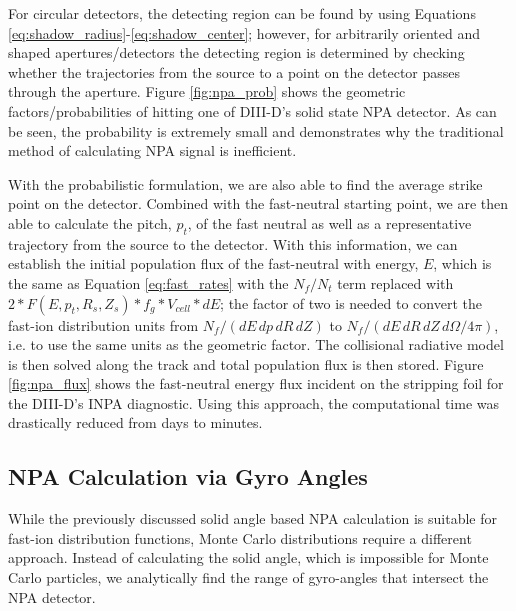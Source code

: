 For circular detectors, the detecting region can be found by using Equations \ref{eq:shadow_radius}-\ref{eq:shadow_center}; however, for arbitrarily oriented and shaped apertures/detectors the detecting region is determined by checking whether the trajectories from the source to a point on the detector passes through the aperture.
Figure \ref{fig:npa_prob} shows the geometric factors/probabilities of hitting one of DIII-D's solid state NPA detector. As can be seen, the probability is extremely small and demonstrates why the traditional method of calculating NPA signal is inefficient. 

With the probabilistic formulation, we are also able to find the average strike point on the detector. Combined with the fast-neutral starting point, we are then able to calculate the pitch, $p_t$, of the fast neutral as well as a representative trajectory from the source to the detector. With this information, we can establish the initial population flux of the fast-neutral with energy, $E$, which is the same as Equation \ref{eq:fast_rates} with the $N_f/N_t$ term replaced with $2*F(E,p_t,R_s,Z_s)*f_g*V_{cell}*dE$; the factor of two is needed to convert the fast-ion distribution units from $N_f/(dE\,dp\,dR\,dZ)$ to $N_f/(dE\,dR\,dZ\,d\Omega/4\pi)$, i.e. to use the same units as the geometric factor. The collisional radiative model is then solved along the track and total population flux is then stored. Figure \ref{fig:npa_flux} shows the fast-neutral energy flux incident on the stripping foil for the DIII-D's INPA diagnostic. Using this approach, the computational time was drastically reduced from days to minutes.

\subsection{NPA Calculation via Gyro Angles}
While the previously discussed solid angle based NPA calculation is suitable for fast-ion distribution functions, Monte Carlo distributions require a different approach. Instead of calculating the solid angle, which is impossible for Monte Carlo particles, we analytically find the range of gyro-angles that intersect the NPA detector. 

